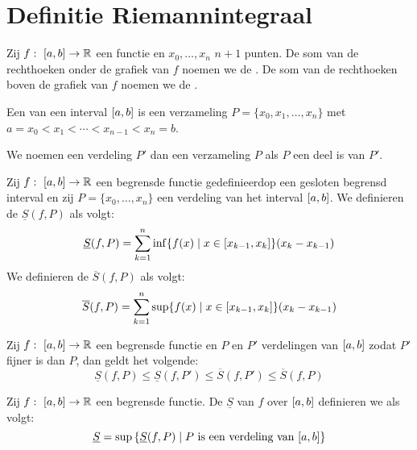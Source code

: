 \documentclass[main.tex]{subfiles}
\begin{document}
\section{Definitie Riemannintegraal}
\label{sec:defin-riem}

\begin{de}
  Zij $f:\ \interval{a}{b} \rightarrow \mathbb{R}$ een functie en $x_{0}, \dotsc, x_{n}$ $n+1$ punten.
  De som van de rechthoeken onder de grafiek van $f$ noemen we de .
  De som van de rechthoeken boven de grafiek van $f$ noemen we de .
\end{de}

\begin{de}
  Een  van een interval $\interval{a}{b}$ is een verzameling $P = \{x_{0},x_{1},\dotsc,x_{n}\}$ met $a = x_{0} < x_{1} < \dotsb < x_{n-1} < x_{n} = b$.
\end{de}

\begin{de}
  We noemen een verdeling $P'$  dan een verzameling $P$ als $P$ een deel is van $P'$.
\end{de}

\begin{de}
  Zij $f:\ \interval{a}{b} \rightarrow \mathbb{R}$ een begrensde functie gedefinieerdop een gesloten begrensd interval en zij $P = \{x_{0},\dotsc,x_{n}\}$ een verdeling van het interval $\interval{a}{b}$.
  We definieren de  $\underline{S}(f,P)$ als volgt:
  \[ \underline{S}(f,P) = \sum_{k=1}^{n} \inf\{ f(x) \mid x\in \interval{x_{k-1}}{x_{k}}\} (x_{k}-x_{k-1}) \]
  We definieren de  $\overline{S}(f,P)$ als volgt:  
  \[ \overline{S}(f,P) = \sum_{k=1}^{n} \sup\{ f(x) \mid x\in \interval{x_{k-1}}{x_{k}}\} (x_{k}-x_{k-1}) \]
\end{de}

\begin{bpr}
  Zij $f:\ \interval{a}{b} \rightarrow \mathbb{R}$ een begrensde functie en $P$ en $P'$ verdelingen van $\interval{a}{b}$ zodat $P'$ fijner is dan $P$, dan geldt het volgende:
  \[ \underline{S}(f,P) \le \underline{S}(f,P') \le \overline{S}(f,P') \le \overline{S}(f,P) \]
\end{bpr}

\begin{de}
  Zij $f:\ \interval{a}{b} \rightarrow \mathbb{R}$ een begrensde functie.
  De  $\underline{S}$ van $f$ over $\interval{a}{b}$ definieren we als volgt:
  \[ \underline{S} = \sup\left\{\underline{S}(f,P) \mid P \text{ is een verdeling van } \interval{a}{b} \right\} \]
\end{de}
\end{document}
